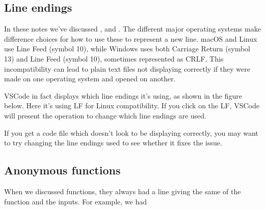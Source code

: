 \documentclass[letterpaper,10pt,british]{sphinxmanual}
\let\sphinxpxdimen\pdfpxdimen\else\newdimen\sphinxpxdimen
\begin{document}
\subsection{Line endings}
\label{\detokenize{chapters/programming_fundamentals/advanced_topics:line-endings}}
\sphinxAtStartPar
In these notes we’ve discussed {\hyperref[\detokenize{chapters/computer_software/major_operating_systems:operating-systems}]{}}, and {\hyperref[\detokenize{chapters/programming_fundamentals/text_encoding:ascii}]{}}. The different major operating systems make difference choices for how to use these to represent a new line. macOS and Linux use Line Feed (symbol 10), while Windows uses both Carriage Return (symbol 13) and Line Feed (symbol 10), sometimes represented as CRLF. This incompatibility can lead to plain text files not displaying correctly if they were made on one operating system and opened on another.

\sphinxAtStartPar
VSCode in fact displays which line endings it’s using, as shown in the figure below. Here it’s using LF for Linux compatibility. If you click on the LF, VSCode will present the operation to change which line endings are used.

\begin{figure}[htbp]
\centering

\noindent\sphinxincludegraphics[width=800\sphinxpxdimen]{{line_endings}.png}
\end{figure}

\sphinxAtStartPar
If you get a code file which doesn’t look to be displaying correctly, you may want to try changing the line endings used to see whether it fixes the issue.


\subsection{Anonymous functions}
\label{\detokenize{chapters/programming_fundamentals/advanced_topics:anonymous-functions}}
\sphinxAtStartPar
When we discussed functions, they always had a  line giving the same of the function and the inputs. For example, we had

\begin{sphinxVerbatim}[commandchars=\\\{\}]
 
          
     
\end{sphinxVerbatim}
\end{document}
